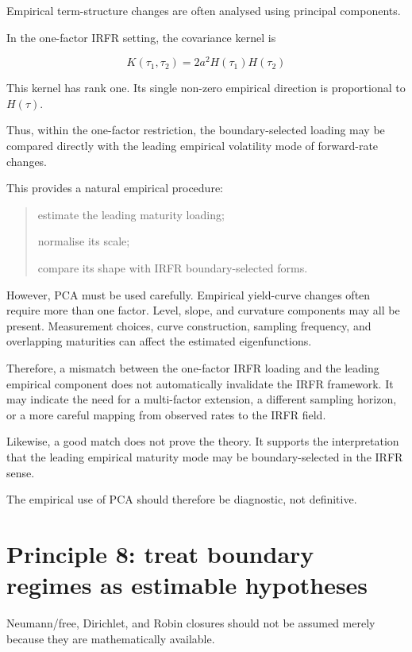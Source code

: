 \documentclass[11pt,oneside]{book}
\begin{document}
Empirical term-structure changes are often analysed using principal
components.

In the one-factor IRFR setting, the covariance kernel is

\[
K(\tau_1,\tau_2)=2a^2H(\tau_1)H(\tau_2)
\]

This kernel has rank one. Its single non-zero empirical direction is
proportional to $H(\tau)$.

Thus, within the one-factor restriction, the boundary-selected loading
may be compared directly with the leading empirical volatility mode of
forward-rate changes.

This provides a natural empirical procedure:

\begin{quote}
\item  estimate the leading maturity loading;

\item  normalise its scale;

\item  compare its shape with IRFR boundary-selected forms.
\end{quote}

However, PCA must be used carefully. Empirical yield-curve changes often
require more than one factor. Level, slope, and curvature components may
all be present. Measurement choices, curve construction, sampling
frequency, and overlapping maturities can affect the estimated
eigenfunctions.

Therefore, a mismatch between the one-factor IRFR loading and the
leading empirical component does not automatically invalidate the IRFR
framework. It may indicate the need for a multi-factor extension, a
different sampling horizon, or a more careful mapping from observed
rates to the IRFR field.

Likewise, a good match does not prove the theory. It supports the
interpretation that the leading empirical maturity mode may be
boundary-selected in the IRFR sense.

The empirical use of PCA should therefore be diagnostic, not definitive.

\section{Principle 8: treat boundary regimes as estimable
hypotheses}\label{principle-8-treat-boundary-regimes-as-estimable-hypotheses}

Neumann/free, Dirichlet, and Robin closures should not be assumed merely
because they are mathematically available.
\end{document}
